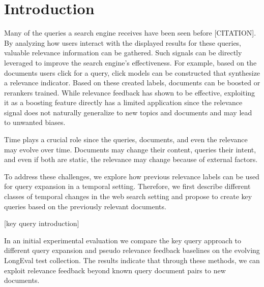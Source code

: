 \section{Introduction}

Many of the queries a search engine receives have been seen before {\color{red}[CITATION]}. By analyzing how users interact with the displayed results for these queries, valuable relevance information can be gathered. Such signals can be directly leveraged to improve the search engine's effectiveness. For example, based on the documents users click for a query, click models can be constructed that synthesize a relevance indicator. Based on these created labels, documents can be boosted or rerankers trained. While relevance feedback has shown to be effective, exploiting it as a boosting feature directly has a limited application since the relevance signal does not naturally generalize to new topics and documents and may lead to unwanted biases. 

Time plays a crucial role since the queries, documents, and even the relevance may evolve over time. Documents may change their content, queries their intent, and even if both are static, the relevance may change because of external factors.

To address these challenges, we explore how previous relevance labels can be used for query expansion in a temporal setting. Therefore, we first describe different classes of temporal changes in the web search setting and propose to create key queries based on the previously relevant documents.

{\color{red}[key query introduction]}

In an initial experimental evaluation we compare the key query approach to different query expansion and pseudo relevance feedback baselines on the evolving LongEval test collection. The results indicate that through these methods, we can exploit relevance feedback beyond known query document pairs to new documents. 



